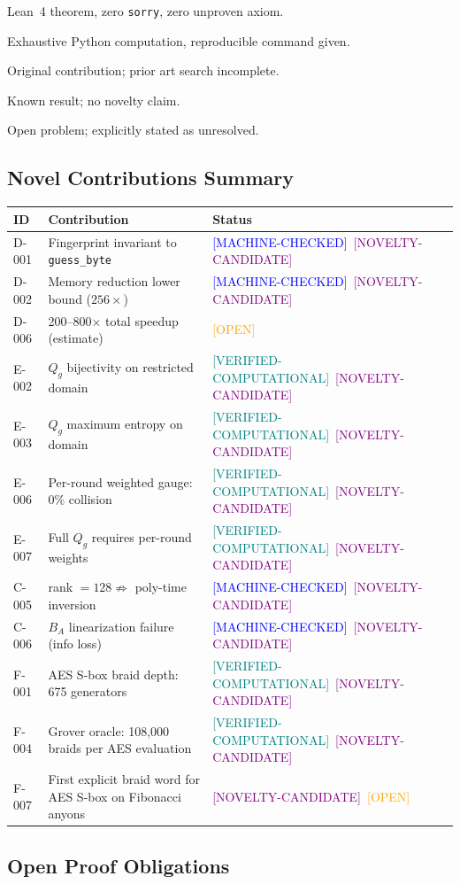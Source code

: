 \documentclass[11pt,letterpaper]{article}
\newcommand{\MC}{\textcolor{blue}{[MACHINE-CHECKED]}}
\newcommand{\VC}{\textcolor{teal}{[VERIFIED-COMPUTATIONAL]}}
\newcommand{\OP}{\textcolor{orange}{[OPEN]}}
\newcommand{\NA}{\textcolor{gray}{[KNOWN-PRIOR-ART]}}
\newcommand{\CN}{\textcolor{purple}{[NOVELTY-CANDIDATE]}}
\begin{document}
\begin{description}[nosep]
\item[\MC] Lean~4 theorem, zero \texttt{sorry}, zero unproven axiom.
\item[\VC] Exhaustive Python computation, reproducible command given.
\item[\CN] Original contribution; prior art search incomplete.
\item[\NA] Known result; no novelty claim.
\item[\OP] Open problem; explicitly stated as unresolved.
\end{description}

\subsection{Novel Contributions Summary}

\begin{center}
\begin{tabular}{lll}
\toprule
ID & Contribution & Status \\
\midrule
D-001 & Fingerprint invariant to \texttt{guess\_byte} & \MC\ \CN \\
D-002 & Memory reduction lower bound ($256\times$) & \MC\ \CN \\
D-006 & 200--800$\times$ total speedup (estimate) & \OP \\
E-002 & $Q_g$ bijectivity on restricted domain & \VC\ \CN \\
E-003 & $Q_g$ maximum entropy on domain & \VC\ \CN \\
E-006 & Per-round weighted gauge: $0\%$ collision & \VC\ \CN \\
E-007 & Full $Q_g$ requires per-round weights & \VC\ \CN \\
C-005 & rank $= 128 \not\Rightarrow$ poly-time inversion & \MC\ \CN \\
C-006 & $B_A$ linearization failure (info loss) & \MC\ \CN \\
F-001 & AES S-box braid depth: 675 generators & \VC\ \CN \\
F-004 & Grover oracle: 108,000 braids per AES evaluation & \VC\ \CN \\
F-007 & First explicit braid word for AES S-box on Fibonacci anyons & \CN\ \OP \\
\bottomrule
\end{tabular}
\end{center}

\subsection{Open Proof Obligations}
\end{document}
